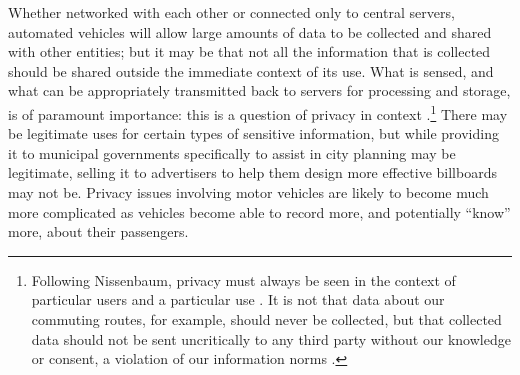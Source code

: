 Whether networked with each other or connected only to central
servers, automated vehicles will allow large amounts of data to be collected
and shared with other entities; but it may be that not all the
information that is collected should be shared outside the immediate
context of its use. What is sensed, and what can be appropriately
transmitted back to servers for processing and storage, is of
paramount importance: this is a question of privacy in context
\cite{nissenbaum}.\footnote{Following Nissenbaum, privacy must always
  be seen in the context of 
particular users and a particular use \cite[p. 2]{nissenbaum}. It is not that data about our
commuting routes, for example, should never be collected, but that collected data
should not be sent uncritically to any third party without our
knowledge or consent, a violation of our information norms \cite[p.
  3]{nissenbaum}.}
There may be legitimate uses for certain types of sensitive information, but
while providing it to municipal governments specifically to assist in
city planning may be legitimate, selling it to advertisers to help
them design more effective billboards may not be. Privacy issues
involving motor vehicles are likely to become much more complicated as
vehicles become able to record more, and potentially ``know'' more,
about their passengers.



